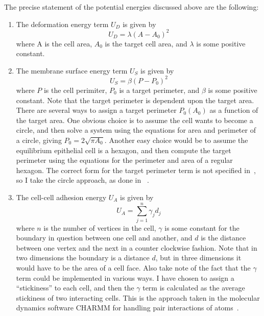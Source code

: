 The precise statement of the potential energies discussed above are the following:

\begin{enumerate}
\item The deformation energy term $U_D$ is given by \\ 
\begin{equation}
U_D = \lambda(A - A_0)^2
\end{equation}
 where A is the cell area, $A_0$ is the target cell area, and $\lambda$ is some positive constant.
\item The membrane surface energy term $U_S$ is given by
\begin{equation}
U_S = \beta(P - P_0)^2
\end{equation}
 where $P$ is the cell perimiter, $P_0$ is a target perimeter, and $\beta$ is some positive constant. Note that the target perimeter is dependent upon the target area. There are several ways to assign a target perimeter $P_0(A_0)$ as a function of the target area. One obvious choice is to assume the cell wants to become a circle, and then solve a system using the equations for area and perimeter of a circle, giving $P_0 =2\sqrt{\pi A_0}$. Another easy choice would be to assume the equilibrium epithelial cell is a hexagon, and then compute the target perimeter using the equations for the perimeter and area of a regular hexagon. The correct form for the target perimeter term is not specified in~\cite{HondaNagai}, so I take the circle approach, as done in ~\cite{ChasteMain}.

\item The cell-cell adhesion energy $U_A$ is given by
\begin{equation}U_A = \displaystyle\sum\limits_{j = 1}^{n}\gamma_{j}d_{j}\end{equation}
where $n$ is the number of vertices in the cell, $\gamma$ is some constant for the boundary in question between one cell and another, and $d$ is the distance between one vertex and the next in a counter clockwise fashion. Note that in two dimensions the boundary is a distance $d$, but in three dimensions it would have to be the area of a cell face. Also take note of the fact that the $\gamma$ term could be implemented in various ways. I have chosen to assign a ``stickiness'' to each cell, and then the $\gamma$ term is calculated as the average stickiness of two interacting cells. This is the approach taken in the molecular dynamics software CHARMM for handling pair interactions of atoms~\cite{CHARMM}.


\end{enumerate}
